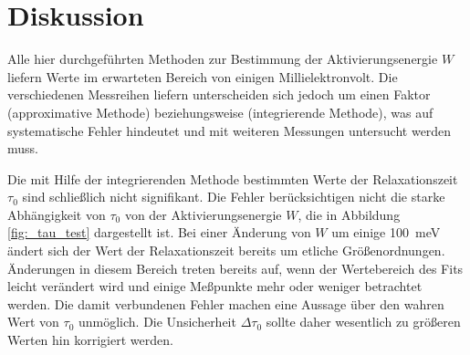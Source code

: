 \section{Diskussion}
\label{sec:diskussion}
Alle hier durchgeführten Methoden zur Bestimmung der Aktivierungsenergie $W$
liefern Werte im erwarteten Bereich von einigen Millielektronvolt.
Die verschiedenen Messreihen liefern unterscheiden sich jedoch um einen Faktor
 (approximative Methode) beziehungsweise
 (integrierende Methode), was
auf systematische Fehler hindeutet und mit weiteren Messungen untersucht
werden muss.

Die mit Hilfe der integrierenden Methode bestimmten Werte der Relaxationszeit
$\tau_0$ sind schließlich nicht signifikant.
Die Fehler berücksichtigen nicht die starke Abhängigkeit von $\tau_0$ von der
Aktivierungsenergie $W$, die in Abbildung \ref{fig:_tau_test} dargestellt ist.
Bei einer Änderung von $W$ um einige \SI{100}{\milli\electronvolt} ändert
sich der Wert der Relaxationszeit bereits um etliche Größenordnungen.
Änderungen in diesem Bereich treten bereits auf, wenn der Wertebereich des Fits
leicht verändert wird und einige Meßpunkte mehr oder weniger betrachtet werden.
Die damit verbundenen Fehler machen eine Aussage über den wahren Wert von
$\tau_0$ unmöglich.
Die Unsicherheit $\Delta\tau_0$ sollte daher wesentlich zu größeren Werten hin
korrigiert werden.
